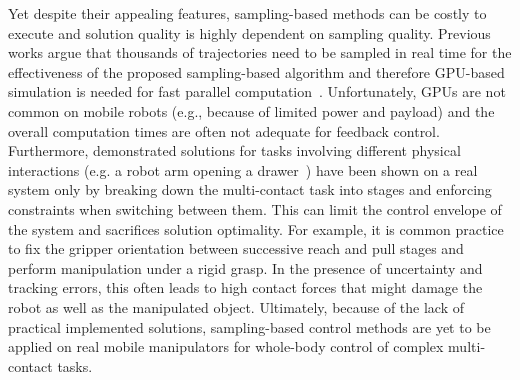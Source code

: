 Yet despite their appealing features, sampling-based methods can be costly to execute and solution quality is highly dependent on sampling quality. Previous works argue that thousands of trajectories need to be sampled in real time for the effectiveness of the proposed sampling-based algorithm and therefore GPU-based simulation is needed for fast parallel computation~\cite{williams_model_2017}. Unfortunately, GPUs are not common on mobile robots (e.g., because of limited power and payload) and the overall computation times are often not adequate for feedback control. 
Furthermore, demonstrated solutions for tasks involving different physical interactions (e.g. a robot arm opening a drawer~\cite{abraham_model-based_2020}) have been shown on a real system only by breaking down the multi-contact task into stages and enforcing constraints when switching between them. 
This can limit the control envelope of the system and sacrifices solution optimality. For example, it is common practice to fix the gripper orientation between successive reach and pull stages and perform manipulation under a rigid grasp. In the presence of uncertainty and tracking errors, this often leads to high contact forces that might damage the robot as well as the manipulated object.
Ultimately, because of the lack of practical implemented solutions, sampling-based control methods are yet to be applied on real mobile manipulators for whole-body control of complex multi-contact tasks.   


